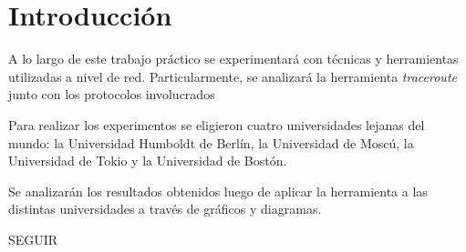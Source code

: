 \section{Introducción}

A lo largo de este trabajo práctico se experimentará con técnicas
y herramientas utilizadas a nivel de red. Particularmente, se analizará
la herramienta \textit{traceroute} junto con los protocolos involucrados

Para realizar los experimentos se eligieron cuatro universidades lejanas
del mundo: la Universidad Humboldt de Berlín, la Universidad de Moscú,
la Universidad de Tokio y la Universidad de Bostón.

Se analizarán los resultados obtenidos luego de aplicar la herramienta a
las distintas universidades a través de gráficos y diagramas.

SEGUIR
